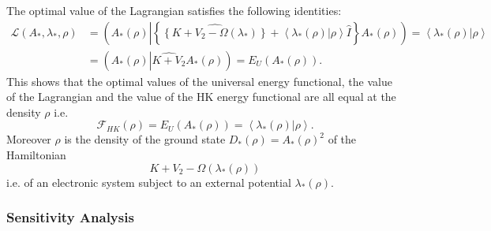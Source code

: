 \documentclass[aps,preprint]{revtex4}%
\begin{document}
The optimal value of the Lagrangian satisfies the following identities:
\begin{align}
\mathcal{L}\left(  A_{\ast},\lambda_{\ast},\rho\right)   &  =\left(  A_{\ast
}\left(  \rho\right)  \left\vert \left\{  \widehat{\left\{  K+V_{2}%
-\Omega\left(  \lambda_{\ast}\right)  \right\}  }+\left\langle \left.
\lambda_{\ast}\left(  \rho\right)  \right\vert \rho\right\rangle \hat
{I}\right\}  \right.  A_{\ast}\left(  \rho\right)  \right)  =\left\langle
\left.  \lambda_{\ast}\left(  \rho\right)  \right\vert \rho\right\rangle
\nonumber\\
&  =\left(  A_{\ast}\left(  \rho\right)  \left\vert \widehat{K+V_{2}}\right.
A_{\ast}\left(  \rho\right)  \right)  =E_{U}\left(  A_{\ast}\left(
\rho\right)  \right)  .
\end{align}
This shows that the optimal values of the universal energy functional, the
value of the Lagrangian and the value of the HK energy functional are all
equal at the density $\rho$ i.e.
\begin{equation}
\mathcal{F}_{HK}\left(  \rho\right)  =E_{U}\left(  A_{\ast}\left(
\rho\right)  \right)  =\left\langle \left.  \lambda_{\ast}\left(  \rho\right)
\right\vert \rho\right\rangle .
\end{equation}
Moreover $\rho$ is the density of the ground state $D_{\ast}\left(
\rho\right)  =A_{\ast}\left(  \rho\right)  ^{2}$ of the Hamiltonian
\begin{equation}
K+V_{2}-\Omega\left(  \lambda_{\ast}\left(  \rho\right)  \right)
\end{equation}
i.e. of an electronic system subject to an external potential $\lambda_{\ast
}\left(  \rho\right)  $.

\subsubsection{Sensitivity Analysis\label{SenAnal}}
\end{document}
